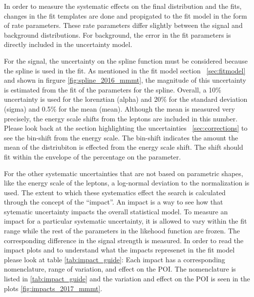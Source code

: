 In order to measure the systematic effects on the final distribution and the fits, changes in the fit templates are done and propigated to the fit model in the form of rate parameters. These rate parameters differ slightly between the signal and background distributions. 
For background, the error in the fit parameters is directly included in the uncertainty model. 

For the signal, the uncertainty on the spline function must be considered because the spline is used in the fit. As mentioned in the fit model section ~\ref{sec:fitmodel} and shown in firgure \ref{fig:spline_2016_mmmt}, the magnitude of this uncertainty is estimated from the fit of the parameters for the spline. Overall, a 10\% uncertainty is used for the lorenztian (alpha) and 20\% for the standard deviation (sigma) and 0.5\% for the mean (mean). Although the mean is measured very precisely, the energy scale shifts from the leptons are included in this number. Please look back at the section highlighting the uncertainties ~\ref{sec:corrections} to see the bin-shift from the energy scale. The bin-shift indicates the amount the mean of the distriubiton is effected from the energy scale shift. The shift should fit within the envelope of the percentage on the parameter. 


For the other systematic uncertainties that are not based on parametric shapes, like the energy scale of the leptons, a log-normal deviation to the normalization is used. 
The extent to which these systematics effect the search is calculated through the concept of the ``impact''. An impact is a way to see how that sytematic uncertainty impacts the overall statistical model. To measure an impact for a particular systematic uncertainty, it is allowed to vary within the fit range while the rest of the parameters in the likehood function are frozen. The corresponding difference in the signal strength is measured. 
In order to read the impact plots and to understand what the impacts represenet in the fit model please look at table \ref{tab:impact_guide}:
Each impact has a corresponding nomenclature, range of variation, and effect on the POI. The nomenclature is listed in \ref{tab:impact_guide} and the variation and effect on the POI is seen in the plots \ref{fig:impacts_2017_mmmt}.

